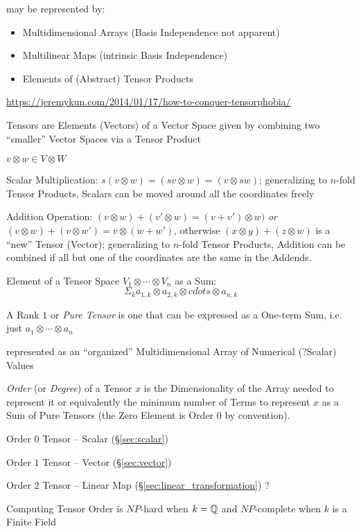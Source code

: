 may be represented by:
\begin{itemize}
  \item Multidimensional Arrays (Basis Independence not apparent)
  \item Multilinear Maps (intrinsic Basis Independence)
  \item Elements of (Abstract) Tensor Products
\end{itemize}

\fist
\url{https://jeremykun.com/2014/01/17/how-to-conquer-tensorphobia/}

Tensors are Elements (Vectors) of a Vector Space given by
combining two ``smaller'' Vector Spaces via a Tensor Product

$v \otimes w \in V \otimes W$

Scalar Multiplication: $s(v \otimes w) = (sv \otimes w) = (v \otimes
sw)$; generalizing to  $n$-fold Tensor Products, Scalars can be moved
around all the coordinates freely

Addition Operation: $(v \otimes w) + (v' \otimes w) = (v + v') \otimes
w)$ \emph{or} $(v \otimes w) + (v \otimes w') = v \otimes (w + w')$,
otherwise $(x \otimes y) + (z \otimes w)$ is a ``new'' Tensor
(Vector); generalizing to $n$-fold Tensor Products, Addition can be
combined if all but one of the coordinates are the same in the
Addends.

Element of a Tensor Space $V_1 \otimes \cdots \otimes V_n$ as a Sum:
\[
  \Sigma_k a_{1,k} \otimes a_{2,k} \otimes cdots \otimes a_{n,k}
\]

A Rank $1$ or \emph{Pure Tensor} is one that can be expressed as a
One-term Sum, i.e. just $a_1 \otimes \cdots \otimes a_n$


\asterism


represented as an ``organized'' Multidimensional Array of Numerical
(?Scalar) Values

\emph{Order} (or \emph{Degree}) of a Tensor $x$ is the
Dimensionality of the Array needed to represent it or equivalently the
minimum number of Terms to represent $x$ as a Sum of Pure Tensors (the
Zero Element is Order $0$ by convention).

Order $0$ Tensor -- Scalar (\S\ref{sec:scalar})

Order $1$ Tensor -- Vector (\S\ref{sec:vector})

Order $2$ Tensor -- Linear Map (\S\ref{sec:linear_transformation}) ?

Computing Tensor Order is $NP$-hard when $k = \mathbb{Q}$ and $NP$-complete
when $k$ is a Finite Field %


